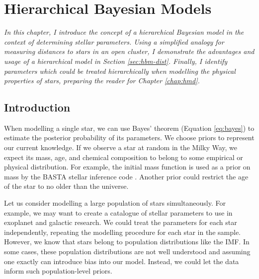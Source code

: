 %
%
%
%
%
\chapter{Hierarchical Bayesian Models}\label{chap:hbm}

\textit{In this chapter, I introduce the concept of a hierarchical Bayesian model in the context of determining stellar parameters. Using a simplified analogy for measuring distances to stars in an open cluster, I demonstrate the advantages and usage of a hierarchical model in Section \ref{sec:hbm-dist}. Finally, I identify parameters which could be treated hierarchically when modelling the physical properties of stars, preparing the reader for Chapter \ref{chap:hmd}.}

\section{Introduction}

When modelling a single star, we can use Bayes' theorem (Equation \ref{eq:bayes}) to estimate the posterior probability of its parameters. We choose priors to represent our current knowledge. If we observe a star at random in the Milky Way, we expect its mass, age, and chemical composition to belong to some empirical or physical distribution. For example, the initial mass function \citep[IMF; e.g.][]{Chabrier2003} is used as a prior on mass by the BASTA stellar inference code \citep{AguirreBorsen-Koch.Rorsted.ea2022}. Another prior could restrict the age of the star to no older than the universe.

Let us consider modelling a large population of stars simultaneously. For example, we may want to create a catalogue of stellar parameters to use in exoplanet and galactic research. We could treat the parameters for each star independently, repeating the modelling procedure for each star in the sample. However, we know that stars belong to population distributions like the IMF. In some cases, these population distributions are not well understood and assuming one exactly can introduce bias into our model. Instead, we could let the data inform such population-level priors.

